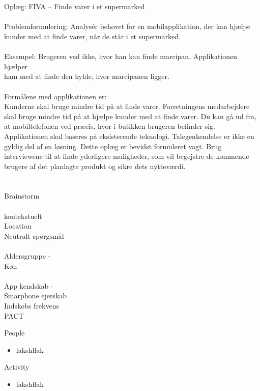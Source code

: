 \documentclass[12pt]{article}
\begin{document}
\section*{}
Oplæg: FIVA – Finde varer i et supermarked\\
\\
Problemformulering: Analysér behovet for en mobilapplikation, der kan hjælpe kunder med at finde varer, når de står i et
supermarked.\\
\\
Eksempel: Brugeren ved ikke, hvor han kan finde marcipan. Applikationen hjælper\\
ham med at finde den hylde, hvor marcipanen ligger.\\
\\
Formålene med applikationen er:\\
Kunderne skal bruge mindre tid på at finde varer.
Forretningens medarbejdere skal bruge mindre tid på at hjælpe kunder med at finde varer. Du kan gå ud fra, at mobiltelefonen ved præcis, hvor i butikken brugeren befinder sig. Applikationen skal baseres på eksisterende teknologi. Talegenkendelse er ikke en gyldig del af en løsning. Dette oplæg er bevidst formuleret vagt. Brug interviewene til at finde yderligere muligheder, som vil begejstre de kommende brugere af det planlagte produkt og sikre dets nytteværdi.

\section*{}

Brainstorm\\
\\
kontekstuelt\\
Location\\
Neutralt sp\o rgsm\aa l\\
\\
Aldersgruppe - \\ 
K\o n\\
\\
App kendskab - \\
Smarphone ejerskab\\
Indsk\o bs frekvens\\

PACT

People
\begin{itemize}
\item lakshflak
\end{itemize}

Activity
\begin{itemize}
\item lakshflak
\end{itemize}
\end{document}

